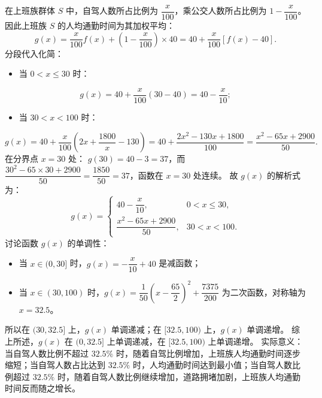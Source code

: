 \begin{answer}
在上班族群体 $S$ 中，自驾人数所占比例为 $\dfrac{x}{100}$，乘公交人数所占比例为 $1 - \dfrac{x}{100}$。
因此上班族 $S$ 的人均通勤时间为其加权平均：
\nopagebreak[4]
\[g(x) = \frac{x}{100} f(x) + \left(1 - \frac{x}{100}\right) \times 40 = 40 + \frac{x}{100}[f(x) - 40].\]
分段代入化简：
\begin{itemize}
\item 当 $0 < x \le 30$ 时：
\end{itemize}
\nopagebreak[4]
\[g(x) = 40 + \frac{x}{100}(30 - 40) = 40 - \frac{x}{10};\]
\begin{itemize}
\item 当 $30 < x < 100$ 时：
\end{itemize}
\nopagebreak[4]
\[g(x) = 40 + \frac{x}{100}\left(2x + \frac{1800}{x} - 130\right) = 40 + \frac{2x^2 - 130x + 1800}{100} = \frac{x^2 - 65x + 2900}{50}.\]
在分界点 $x = 30$ 处：
$g(30) = 40 - 3 = 37$，而 $\dfrac{30^2 - 65 \times 30 + 2900}{50} = \dfrac{1850}{50} = 37$，函数在 $x = 30$ 处连续。
故 $g(x)$ 的解析式为：
\nopagebreak[4]
\[g(x) = \begin{cases} 40 - \dfrac{x}{10}, & 0 < x \le 30, \\ \dfrac{x^2 - 65x + 2900}{50}, & 30 < x < 100. \end{cases}\]
讨论函数 $g(x)$ 的单调性：
\begin{itemize}
\item 当 $x \in (0, 30]$ 时，$g(x) = -\dfrac{x}{10} + 40$ 是减函数；
\item 当 $x \in (30, 100)$ 时，$g(x) = \dfrac{1}{50}\left(x - \dfrac{65}{2}\right)^2 + \dfrac{7375}{200}$ 为二次函数，对称轴为 $x = 32.5$。
\end{itemize}
  所以在 $(30, 32.5]$ 上，$g(x)$ 单调递减；在 $[32.5, 100)$ 上，$g(x)$ 单调递增。
综上所述，$g(x)$ 在 $(0, 32.5]$ 上单调递减，在 $[32.5, 100)$ 上单调递增。
实际意义：
当自驾人数比例不超过 $32.5\%$ 时，随着自驾比例增加，上班族人均通勤时间逐步缩短；当自驾人数占比达到 $32.5\%$ 时，人均通勤时间达到最小值；当自驾人数比例超过 $32.5\%$ 时，随着自驾人数比例继续增加，道路拥堵加剧，上班族人均通勤时间反而随之增长。



\end{answer}
